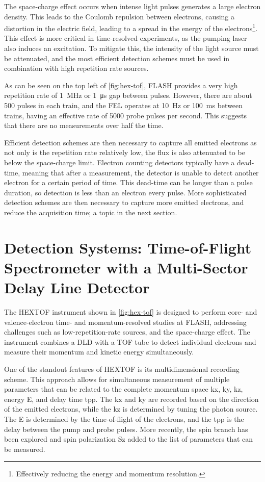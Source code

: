 The space-charge effect occurs when intense light pulses generates a large electron density. This leads to the Coulomb repulsion between electrons, causing a distortion in the electric field, leading to a spread in the energy of the electrons\footnote{Effectively reducing the energy and momentum resolution.}. This effect is more critical in time-resolved experiments, as the pumping laser also induces an excitation. To mitigate this, the intensity of the light source must be attenuated, and the most efficient detection schemes must be used in combination with high repetition rate sources.

As can be seen on the top left of \cref{fig:hex-tof}, \gls{FLASH} provides a very high repetition rate of \qty{1}{\mega\hertz} or \qty{1}{\micro\second} gap between \glspl{pulse}. However, there are about 500 pulses in each \gls{train}, and the \gls{FEL} operates at \qty{10}{\Hz} or \qty{100}{\milli\second} between trains, having an effective rate of \num{5000} probe pulses per second. This suggests that there are no measurements over half the time. 

Efficient detection schemes are then necessary to capture all emitted electrons as not only is the repetition rate relatively low, the flux is also attenuated to be below the space-charge limit. Electron counting detectors typically have a dead-time, meaning that after a measurement, the detector is unable to detect another electron for a certain period of time. This dead-time can be longer than a pulse duration, so detection is less than an electron every pulse. More sophisticated detection schemes are then necessary to capture more emitted electrons, and reduce the acquisition time; a topic in the next section.

\section{Detection Systems: Time-of-Flight Spectrometer with a Multi-Sector Delay Line Detector}
The \gls{HEXTOF} instrument shown in \cref{fig:hex-tof} is designed to perform core- and valence-electron time- and momentum-resolved studies at \gls{FLASH}, addressing challenges such as low-repetition-rate sources, and the space-charge effect. The instrument combines a \gls{DLD} with a \gls{TOF} tube to detect individual electrons and measure their momentum and kinetic energy simultaneously.

One of the standout features of \gls{HEXTOF} is its multidimensional recording scheme. This approach allows for simultaneous measurement of multiple parameters that can be related to the complete momentum space \gls{kx}, \gls{ky}, \gls{kz}, energy \gls{E}, and delay time \gls{tpp}. The \gls{kx} and \gls{ky} are recorded based on the direction of the emitted electrons, while the \gls{kz} is determined by tuning the photon source. The \gls{E} is determined by the time-of-flight of the electrons, and the \gls{tpp} is the delay between the pump and probe pulses. More recently, the spin branch has been explored and spin polarization \gls{Sz} added to the list of parameters that can be measured. 

